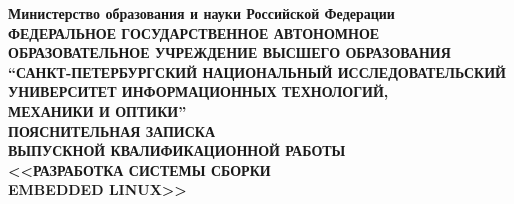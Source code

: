
\thispagestyle{empty}

\begin{center}
  {
    \bfseries
    {
      \subnormal
      Министерство образования и науки Российской Федерации
    } \\[-0.5em]
    {
      \scriptsize
      ФЕДЕРАЛЬНОЕ ГОСУДАРСТВЕННОЕ АВТОНОМНОЕ ОБРАЗОВАТЕЛЬНОЕ УЧРЕЖДЕНИЕ ВЫСШЕГО ОБРАЗОВАНИЯ
    } \\[-0.25em]
    {
      \subnormal
      “САНКТ-ПЕТЕРБУРГСКИЙ НАЦИОНАЛЬНЫЙ ИССЛЕДОВАТЕЛЬСКИЙ \\[-0.5em]
      УНИВЕРСИТЕТ ИНФОРМАЦИОННЫХ ТЕХНОЛОГИЙ, \\[-0.75em]
      МЕХАНИКИ И ОПТИКИ”
    } \\[0.25em]
    {
      \normalsize
      ПОЯСНИТЕЛЬНАЯ ЗАПИСКА \\[-0.5em]
      ВЫПУСКНОЙ КВАЛИФИКАЦИОННОЙ РАБОТЫ
    } \\[5.75em]
    {
      \normalsize
      <<РАЗРАБОТКА СИСТЕМЫ СБОРКИ \\[-0.5em]
      EMBEDDED LINUX>>
    } \\[5.75em]
  }
\end{center}

